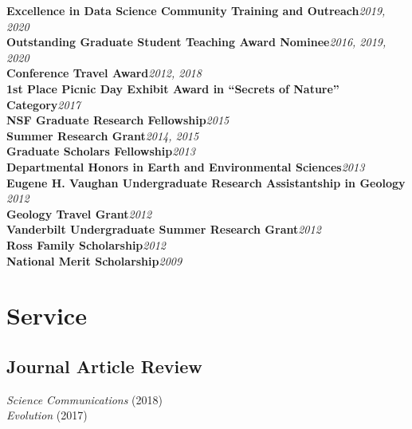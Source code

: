 \documentclass[12pt]{article}
\begin{document}
\textbf{Excellence in Data Science Community Training and Outreach}\hfill \emph{2019, 2020}\\
\textbf{Outstanding Graduate Student Teaching Award Nominee}\hfill \emph{2016, 2019, 2020}\\
\textbf{Conference Travel Award}\hfill \emph{2012, 2018}\\
\textbf{1st Place Picnic Day Exhibit Award in “Secrets of Nature” Category}\hfill \emph{2017}\\
\textbf{NSF Graduate Research Fellowship}\hfill \emph{2015}\\
\textbf{Summer Research Grant}\hfill \emph{2014, 2015}\\
\textbf{Graduate Scholars Fellowship}\hfill \emph{2013}\\
\textbf{Departmental Honors in Earth and Environmental Sciences}\hfill \emph{2013}\\
\textbf{Eugene H. Vaughan Undergraduate Research Assistantship in Geology }\hfill \emph{2012}\\
\textbf{Geology Travel Grant}\hfill \emph{2012}\\
\textbf{Vanderbilt Undergraduate Summer Research Grant}\hfill \emph{2012}\\
\textbf{Ross Family Scholarship}\hfill \emph{2012}\\
\textbf{National Merit Scholarship}\hfill \emph{2009}\\


\vspace{-0.35em}

\section{Service}

\subsection{Journal Article Review}

\emph{Science Communications} (2018)\\
\emph{Evolution} (2017)
\end{document}
